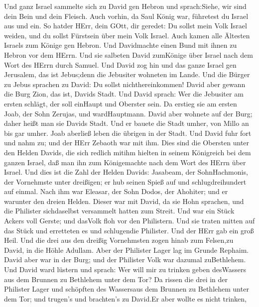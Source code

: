  Und ganz Israel sammelte sich zu David gen Hebron und
sprach:Siehe, wir sind dein Bein und dein Fleisch.  Auch
vorhin, da Saul König war, führetest du Israel aus und ein. So hatder
HErr, dein GOtt, dir geredet: Du sollst mein Volk Israel weiden, und du
sollst Fürstsein über mein Volk Israel.  Auch kamen alle
Ältesten Israels zum Könige gen Hebron. Und Davidmachte einen Bund mit
ihnen zu Hebron vor dem HErrn. Und sie salbeten David zumKönige über
Israel nach dem Wort des HErrn durch Samuel.  Und David zog
hin und das ganze Israel gen Jerusalem, das ist Jebus;denn die Jebusiter
wohneten im Lande.  Und die Bürger zu Jebus sprachen zu
David: Du sollst nichthereinkommen! David aber gewann die Burg Zion, das
ist, Davids Stadt.  Und David sprach: Wer die Jebusiter am
ersten schlägt, der soll einHaupt und Oberster sein. Da erstieg sie am
ersten Joab, der Sohn Zerujas, und wardHauptmann.  David
aber wohnete auf der Burg; daher heißt man sie Davids Stadt.
 Und er bauete die Stadt umher, von Millo an bis gar umher.
Joab aberließ leben die übrigen in der Stadt.  Und David
fuhr fort und nahm zu; und der HErr Zebaoth war mit ihm. 
Dies sind die Obersten unter den Helden Davids, die sich redlich mitihm
hielten in seinem Königreich bei dem ganzen Israel, daß man ihn zum
Königemachte nach dem Wort des HErrn über Israel.  Und dies
ist die Zahl der Helden Davids: Jasabeam, der SohnHachmonis, der
Vornehmste unter dreißigen; er hub seinen Spieß auf und
schlugdreihundert auf einmal.  Nach ihm war Eleasar, der
Sohn Dodos, der Ahohiter; und er warunter den dreien Helden.
 Dieser war mit David, da sie Hohn sprachen, und die
Philister sichdaselbst versammelt hatten zum Streit. Und war ein Stück
Ackers voll Gerste; und dasVolk floh vor den Philistern. 
Und sie traten mitten auf das Stück und erretteten es und schlugendie
Philister. Und der HErr gab ein groß Heil.  Und die drei
aus den dreißig Vornehmsten zogen hinab zum Felsen,zu David, in die
Höhle Adullam. Aber der Philister Lager lag im Grunde Rephaim.
 David aber war in der Burg; und der Philister Volk war
dazumal zuBethlehem.  Und David ward lüstern und sprach:
Wer will mir zu trinken geben desWassers aus dem Brunnen zu Bethlehem
unter dem Tor?  Da rissen die drei in der Philister Lager
und schöpften des Wassersaus dem Brunnen zu Bethlehem unter dem Tor; und
trugen's und brachten's zu David.Er aber wollte es nicht trinken,
